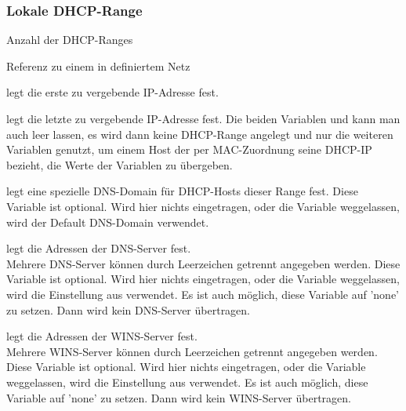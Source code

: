 \subsubsection{Lokale DHCP-Range}
\begin{description}

    {Anzahl der DHCP-Ranges}

    
    {Referenz zu einem in  definiertem Netz}
    

    {legt die erste zu vergebende IP-Adresse fest.}


    {legt die letzte zu vergebende IP-Adresse fest. Die beiden Variablen
     und  kann man auch leer
    lassen, es wird dann keine DHCP-Range angelegt und nur die weiteren Variablen
    genutzt, um einem Host der per MAC-Zuordnung seine DHCP-IP bezieht, die Werte
    der Variablen zu übergeben.}


    {legt eine spezielle DNS-Domain für DHCP-Hosts dieser Range fest.
    Diese Variable ist optional. Wird hier nichts eingetragen, oder die Variable weggelassen,
    wird der Default DNS-Domain  verwendet.}
    

    {legt die Adressen der DNS-Server fest. \\
    Mehrere DNS-Server können durch Leerzeichen getrennt angegeben werden. 
    Diese Variable ist optional. Wird hier nichts eingetragen, oder die Variable weggelassen,
    wird die Einstellung aus  verwendet. 
    Es ist auch möglich, diese Variable auf 'none' zu setzen. Dann wird kein DNS-Server übertragen.}


    {legt die Adressen der WINS-Server fest. \\
    Mehrere WINS-Server können durch Leerzeichen getrennt angegeben werden. 
    Diese Variable ist optional. Wird hier nichts eingetragen, oder die Variable weggelassen,
    wird die Einstellung aus  verwendet. 
    Es ist auch möglich, diese Variable auf 'none' zu setzen. Dann wird kein WINS-Server übertragen.}


\end{description}

